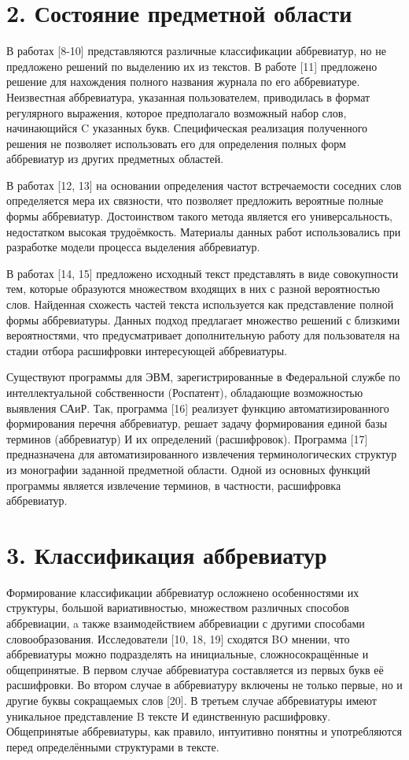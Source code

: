\documentclass{article}
\begin{document}
\section*{2. Состояние предметной области}
В работах [8-10] представляются различные классификации аббревиатур, но не предложено решений по выделению их из текстов.
В работе [11] предложено решение для нахождения полного названия журнала по его аббревиатуре. Неизвестная аббревиатура, указанная пользователем, приводилась в формат регулярного выражения, которое предполагало возможный набор слов, начинающийся C указанных букв. Специфическая реализация полученного решения не позволяет использовать его для определения полных форм аббревиатур из других предметных областей.

В работах [12, 13] на основании определения частот встречаемости соседних слов определяется мера их связности, что позволяет предложить вероятные полные формы аббревиатур. Достоинством такого метода является его универсальность, недостатком высокая трудоёмкость. Материалы данных работ использовались при разработке модели процесса выделения аббревиатур.

В работах [14, 15] предложено исходный текст представлять в виде совокупности тем, которые образуются множеством входящих в них с разной вероятностью слов. Найденная схожесть частей текста используется как представление полной формы аббревиатуры. Данных подход предлагает множество решений с близкими вероятностями, что предусматривает дополнительную работу для пользователя на стадии отбора расшифровки интересующей аббревиатуры.

Существуют программы для ЭВМ, зарегистрированные в Федеральной службе по интеллектуальной собственности \newpage (Роспатент), обладающие возможностью выявления САиР. Так, программа [16] реализует функцию автоматизированного формирования перечня аббревиатур, решает задачу формирования единой базы терминов (аббревиатур) И их определений (расшифровок). Программа [17] предназначена для автоматизированного извлечения терминологических структур из монографии заданной предметной области. Одной из основных функций программы является извлечение терминов, в частности, расшифровка аббревиатур.


\section*{3. Классификация аббревиатур}
Формирование классификации аббревиатур осложнено особенностями их структуры, большой вариативностью, множеством различных способов аббревиации, a также взаимодействием аббревиации с другими способами словообразования. Исследователи [10, 18, 19] сходятся BO мнении, что аббревиатуры можно подразделять на инициальные, сложносокращённые и общепринятые. В первом случае аббревиатура составляется из первых букв её расшифровки. Во втором случае в аббревиатуру включены не только первые, но и другие буквы сокращаемых слов [20]. В третьем случае аббревиатуры имеют уникальное представление B тексте И единственную расшифровку. Общепринятые аббревиатуры, как правило, интуитивно понятны и употребляются перед определёнными структурами в тексте.
\end{document}
